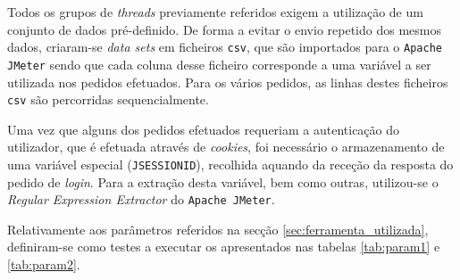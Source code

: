 Todos os grupos de \textit{threads} previamente referidos exigem a utilização de um conjunto de dados pré-definido. De forma a evitar o envio repetido dos mesmos dados, criaram-se \textit{data sets} em ficheiros \texttt{csv}, que são importados para o \texttt{Apache JMeter} sendo que cada coluna desse ficheiro corresponde a uma variável a ser utilizada nos pedidos efetuados. Para os vários pedidos, as linhas destes ficheiros \texttt{csv} são percorridas sequencialmente.

Uma vez que alguns dos pedidos efetuados requeriam a autenticação do utilizador, que é efetuada através de \textit{cookies}, foi necessário o armazenamento de uma variável especial (\texttt{JSESSIONID}), recolhida aquando da receção da resposta do pedido de \textit{login}. Para a extração desta variável, bem como outras, utilizou-se o \textit{Regular Expression Extractor} do \texttt{Apache JMeter}.

Relativamente aos parâmetros referidos na secção \ref{sec:ferramenta_utilizada}, definiram-se como testes a executar os apresentados nas tabelas \ref{tab:param1} e \ref{tab:param2}.

